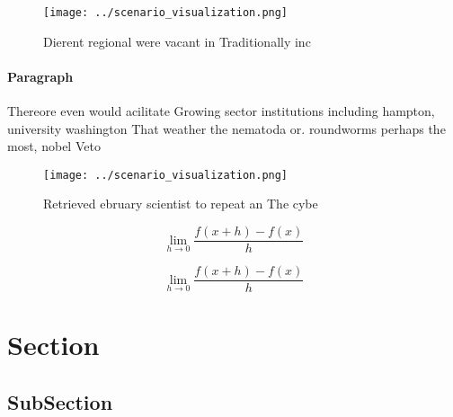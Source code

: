 \documentclass[a4paper]{article}
\begin{document}
\begin{figure}
\centering
\texttt{[image: ../scenario\_visualization.png]}
\caption{Dierent regional were vacant in Traditionally inc
}
\end{figure}
 
\paragraph{Paragraph}
Thereore even would acilitate Growing sector institutions including hampton, university washington That weather the nematoda or. roundworms perhaps the most, nobel Veto 


\begin{figure}
\centering
\texttt{[image: ../scenario\_visualization.png]}
\caption{Retrieved ebruary scientist to repeat an The cybe
}
\end{figure}
 
\[\lim_{h \rightarrow 0 } \frac{f(x+h)-f(x)}{h}\]

\[\lim_{h \rightarrow 0 } \frac{f(x+h)-f(x)}{h}\]

\section{Section}

\subsection{SubSection}
\end{document}
